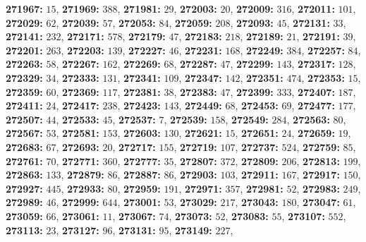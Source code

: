 \textsf{\bfseries 271967:} $15$, \textsf{\bfseries 271969:} $388$, \textsf{\bfseries 271981:} $29$, \textsf{\bfseries 272003:} $20$, \textsf{\bfseries 272009:} $316$, \textsf{\bfseries 272011:} $101$, \textsf{\bfseries 272029:} $62$, \textsf{\bfseries 272039:} $57$, \textsf{\bfseries 272053:} $84$, \textsf{\bfseries 272059:} $208$, \textsf{\bfseries 272093:} $45$, \textsf{\bfseries 272131:} $33$, \textsf{\bfseries 272141:} $232$, \textsf{\bfseries 272171:} $578$, \textsf{\bfseries 272179:} $47$, \textsf{\bfseries 272183:} $218$, \textsf{\bfseries 272189:} $21$, \textsf{\bfseries 272191:} $39$, \textsf{\bfseries 272201:} $263$, \textsf{\bfseries 272203:} $139$, \textsf{\bfseries 272227:} $46$, \textsf{\bfseries 272231:} $168$, \textsf{\bfseries 272249:} $384$, \textsf{\bfseries 272257:} $84$, \textsf{\bfseries 272263:} $58$, \textsf{\bfseries 272267:} $162$, \textsf{\bfseries 272269:} $68$, \textsf{\bfseries 272287:} $47$, \textsf{\bfseries 272299:} $143$, \textsf{\bfseries 272317:} $128$, \textsf{\bfseries 272329:} $34$, \textsf{\bfseries 272333:} $131$, \textsf{\bfseries 272341:} $109$, \textsf{\bfseries 272347:} $142$, \textsf{\bfseries 272351:} $474$, \textsf{\bfseries 272353:} $15$, \textsf{\bfseries 272359:} $60$, \textsf{\bfseries 272369:} $117$, \textsf{\bfseries 272381:} $38$, \textsf{\bfseries 272383:} $47$, \textsf{\bfseries 272399:} $333$, \textsf{\bfseries 272407:} $187$, \textsf{\bfseries 272411:} $24$, \textsf{\bfseries 272417:} $238$, \textsf{\bfseries 272423:} $143$, \textsf{\bfseries 272449:} $68$, \textsf{\bfseries 272453:} $69$, \textsf{\bfseries 272477:} $177$, \textsf{\bfseries 272507:} $44$, \textsf{\bfseries 272533:} $45$, \textsf{\bfseries 272537:} $7$, \textsf{\bfseries 272539:} $158$, \textsf{\bfseries 272549:} $284$, \textsf{\bfseries 272563:} $80$, \textsf{\bfseries 272567:} $53$, \textsf{\bfseries 272581:} $153$, \textsf{\bfseries 272603:} $130$, \textsf{\bfseries 272621:} $15$, \textsf{\bfseries 272651:} $24$, \textsf{\bfseries 272659:} $19$, \textsf{\bfseries 272683:} $67$, \textsf{\bfseries 272693:} $20$, \textsf{\bfseries 272717:} $155$, \textsf{\bfseries 272719:} $107$, \textsf{\bfseries 272737:} $524$, \textsf{\bfseries 272759:} $85$, \textsf{\bfseries 272761:} $70$, \textsf{\bfseries 272771:} $360$, \textsf{\bfseries 272777:} $35$, \textsf{\bfseries 272807:} $372$, \textsf{\bfseries 272809:} $206$, \textsf{\bfseries 272813:} $199$, \textsf{\bfseries 272863:} $133$, \textsf{\bfseries 272879:} $86$, \textsf{\bfseries 272887:} $86$, \textsf{\bfseries 272903:} $103$, \textsf{\bfseries 272911:} $167$, \textsf{\bfseries 272917:} $150$, \textsf{\bfseries 272927:} $445$, \textsf{\bfseries 272933:} $80$, \textsf{\bfseries 272959:} $191$, \textsf{\bfseries 272971:} $357$, \textsf{\bfseries 272981:} $52$, \textsf{\bfseries 272983:} $249$, \textsf{\bfseries 272989:} $46$, \textsf{\bfseries 272999:} $644$, \textsf{\bfseries 273001:} $53$, \textsf{\bfseries 273029:} $217$, \textsf{\bfseries 273043:} $180$, \textsf{\bfseries 273047:} $61$, \textsf{\bfseries 273059:} $66$, \textsf{\bfseries 273061:} $11$, \textsf{\bfseries 273067:} $74$, \textsf{\bfseries 273073:} $52$, \textsf{\bfseries 273083:} $55$, \textsf{\bfseries 273107:} $552$, \textsf{\bfseries 273113:} $23$, \textsf{\bfseries 273127:} $96$, \textsf{\bfseries 273131:} $95$, \textsf{\bfseries 273149:} $227$, 
